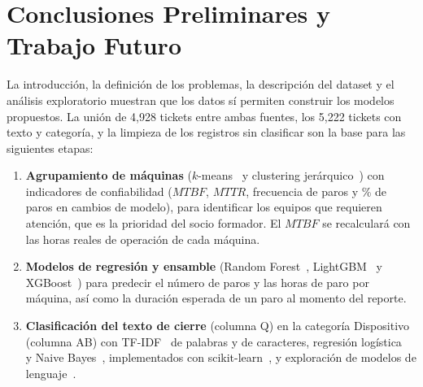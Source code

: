 \documentclass[conference]{IEEEtran}
\begin{document}
\section{Conclusiones Preliminares y Trabajo Futuro}
La introducción, la definición de los problemas, la descripción del dataset y el análisis exploratorio muestran que los datos sí permiten construir los modelos propuestos. La unión de 4,928 tickets entre ambas fuentes, los 5,222 tickets con texto y categoría, y la limpieza de los registros sin clasificar son la base para las siguientes etapas:
\begin{enumerate}
    \item \textbf{Agrupamiento de máquinas} ($k$-means~\cite{macqueen1967} y clustering jerárquico~\cite{ward1963}) con indicadores de confiabilidad ($MTBF$, $MTTR$, frecuencia de paros y \% de paros en cambios de modelo), para identificar los equipos que requieren atención, que es la prioridad del socio formador. El $MTBF$ se recalculará con las horas reales de operación de cada máquina.
    \item \textbf{Modelos de regresión y ensamble} (Random Forest~\cite{breiman2001}, LightGBM~\cite{ke2017} y XGBoost~\cite{chen2016}) para predecir el número de paros y las horas de paro por máquina, así como la duración esperada de un paro al momento del reporte.
    \item \textbf{Clasificación del texto de cierre} (columna Q) en la categoría Dispositivo (columna AB) con TF-IDF~\cite{salton1988} de palabras y de caracteres, regresión logística~\cite{cox1958} y Naive Bayes~\cite{mccallum1998}, implementados con scikit-learn~\cite{pedregosa2011}, y exploración de modelos de lenguaje~\cite{goodfellow2016}.
\end{enumerate}
\end{document}
